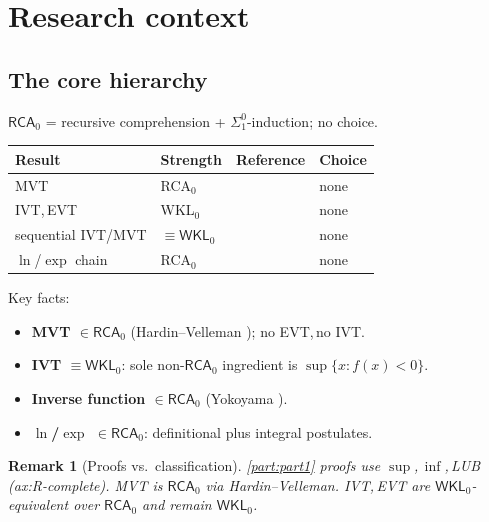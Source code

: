 \documentclass[11pt,reqno]{amsart}
\newcommand{\comma}{,\,\allowbreak}
\theoremstyle{redplain}
\newtheorem{remark}[theorem]{Remark}
\begin{document}
\section{Research context}\label{sec:research}
\subsection{The core hierarchy}
$\textsf{RCA}_0$ = recursive comprehension + $\Sigma^0_1$-induction; no choice.
\begin{center}\small
	\noindent\begin{tabular}{|>{\raggedright\arraybackslash}m{4.5cm}|>{\centering\arraybackslash}m{2.2cm}|>{\centering\arraybackslash}m{3.2cm}|>{\centering\arraybackslash}m{1.3cm}|}
		\hline
		\textbf{Result} & \textbf{Strength} & \textbf{Reference} & \textbf{Choice} \\ \hline
		\textsf{MVT} & \textsf{RCA$_0$} & \cite{HardinVelleman2001} & \textsf{none} \\ \hline
		\textsf{IVT}\comma \textsf{EVT} & \textsf{WKL$_0$} & \cite{Simpson2009} & \textsf{none} \\ \hline
		\textsf{sequential IVT/MVT} & $\equiv\textsf{WKL}_0$ & \cite{Simpson2009,Sanders2020} & \textsf{none} \\ \hline
		$\ln$/$\exp$ chain & \textsf{RCA$_0$} & \cite{Yokoyama2010} & \textsf{none} \\ \hline
	\end{tabular}
\end{center}

\noindent Key facts:
\begin{itemize}
	\item \textbf{MVT $\in\textsf{RCA}_0$} (Hardin--Velleman \cite{HardinVelleman2001}); no EVT\comma no IVT.
	\item \textbf{IVT $\equiv\textsf{WKL}_0$}: sole non-$\textsf{RCA}_0$ ingredient is $\sup\{x:f(x)<0\}$.
	\item \textbf{Inverse function $\in\textsf{RCA}_0$} (Yokoyama \cite[Thm.~3.22]{Yokoyama2010}).
	\item \textbf{$\ln$/$\exp$ $\in\textsf{RCA}_0$}: definitional plus integral postulates.
\end{itemize}

\setcounter{theorem}{0}
\begin{remark}[Proofs vs.\ classification]
\autoref{part:part1} proofs use $\sup$\comma $\inf$\comma LUB (\textsf{ax:R-complete}). MVT is $\textsf{RCA}_0$ via Hardin--Velleman. IVT\comma EVT are $\textsf{WKL}_0$-equivalent over $\textsf{RCA}_0$ and remain $\textsf{WKL}_0$.
\end{remark}
\end{document}
